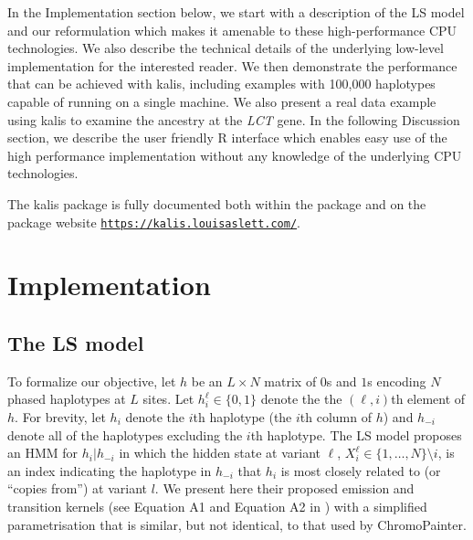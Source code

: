 \documentclass[pdflatex,referee,lineno,sn-nature]{sn-jnl}%
\let\proglang=\textsf
\newcommand{\pkg}[1]{{\fontseries{m}\fontseries{b}\selectfont #1}}
\begin{document}
In the Implementation section below, we start with a description of the LS model and our reformulation which makes it amenable to these high-performance CPU technologies.
We also describe the technical details of the underlying low-level implementation for the interested reader.
We then demonstrate the performance that can be achieved with \pkg{kalis}, including examples with 100,000 haplotypes capable of running on a single machine.
We also present a real data example using \pkg{kalis} to examine the ancestry at the \emph{LCT} gene.
In the following Discussion section, we describe the user friendly \proglang{R} interface which enables easy use of the high performance implementation without any knowledge of the underlying CPU technologies.

The \pkg{kalis} package is fully documented both within the package and on the package website \href{https://kalis.louisaslett.com/}{\texttt{https://kalis.louisaslett.com/}}.



\section*{Implementation}

\subsection*{The LS model}
\label{sec:lsmodel}

To formalize our objective, let \(h\) be an \(L \times N\) matrix of \(0\)s and \(1\)s encoding \(N\) phased haplotypes at \(L\) sites.
Let \(h_i^{\ell} \in \{0,1\}\) denote the the \((\ell,i)\)th element of \(h\).
For brevity, let \(h_i\) denote the \(i\)th haplotype (the \(i\)th column of \(h\)) and \(h_{-i}\) denote all of the haplotypes excluding the \(i\)th haplotype.
The LS model proposes an HMM for \(h_i | h_{-i}\) in which the hidden state at variant \(\ell\), \(X^{\ell}_i \in \{1,\dots,N\} \setminus i\), is an index indicating the haplotype in \(h_{-i}\) that \(h_i\) is most closely related to (or ``copies from'') at variant \(l\).
We present here their proposed emission and transition kernels (see Equation A1 and Equation A2 in \cite{Li2213}) with a simplified parametrisation that is similar, but not identical, to that used by ChromoPainter.
\end{document}
